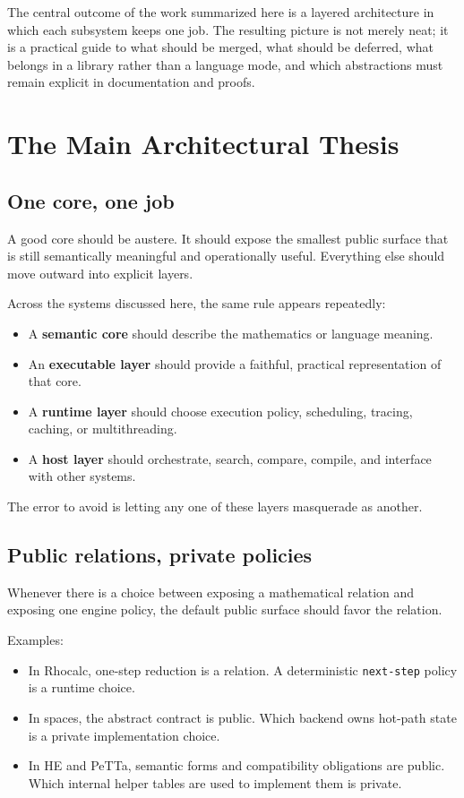 \documentclass[11pt]{article}
\newcommand{\code}[1]{\texttt{#1}}
\newcommand{\strong}[1]{\textbf{#1}}
\begin{document}
The central outcome of the work summarized here is a layered architecture in which each subsystem keeps one job. The resulting picture is not merely neat; it is a practical guide to what should be merged, what should be deferred, what belongs in a library rather than a language mode, and which abstractions must remain explicit in documentation and proofs.

\section{The Main Architectural Thesis}

\subsection{One core, one job}

A good core should be austere. It should expose the smallest public surface that is still semantically meaningful and operationally useful. Everything else should move outward into explicit layers.

Across the systems discussed here, the same rule appears repeatedly:

\begin{itemize}
  \item A \strong{semantic core} should describe the mathematics or language meaning.
  \item An \strong{executable layer} should provide a faithful, practical representation of that core.
  \item A \strong{runtime layer} should choose execution policy, scheduling, tracing, caching, or multithreading.
  \item A \strong{host layer} should orchestrate, search, compare, compile, and interface with other systems.
\end{itemize}

The error to avoid is letting any one of these layers masquerade as another.

\subsection{Public relations, private policies}

Whenever there is a choice between exposing a mathematical relation and exposing one engine policy, the default public surface should favor the relation.

Examples:

\begin{itemize}
  \item In Rhocalc, one-step reduction is a relation. A deterministic \code{next-step} policy is a runtime choice.
  \item In spaces, the abstract contract is public. Which backend owns hot-path state is a private implementation choice.
  \item In HE and PeTTa, semantic forms and compatibility obligations are public. Which internal helper tables are used to implement them is private.
\end{itemize}
\end{document}
